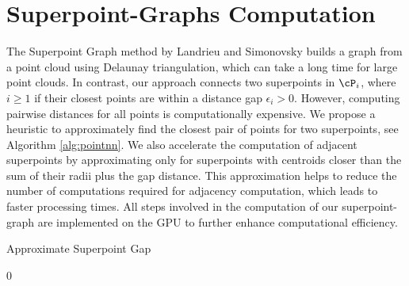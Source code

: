 \section{Superpoint-Graphs Computation}
\label{sec:graphs}

The Superpoint Graph method by Landrieu and Simonovsky \cite{landrieu2018large} builds a graph from a point cloud using Delaunay triangulation, which can take a long time for large point clouds. In contrast, our approach connects two superpoints in $\cP_{i}$, where $i\geq1$ if their closest points are within a distance gap $\epsilon_i>0$. However, computing pairwise distances for all points is computationally expensive. We propose a heuristic to approximately find the closest pair of points for two superpoints, see Algorithm \ref{alg:pointnn}. We also accelerate the computation of adjacent superpoints by approximating only for superpoints with centroids closer than the sum of their radii plus the gap distance. This approximation helps to reduce the number of computations required for adjacency computation, which leads to faster processing times. All steps involved in the computation of our superpoint-graph are implemented on the GPU to further enhance computational efficiency.


\begin{algorithm}
\caption{Approximate Superpoint Gap}\label{alg:pointnn}
\begin{algorithmic}

    \EndFor
    

\end{algorithmic}
\end{algorithm}

  0

